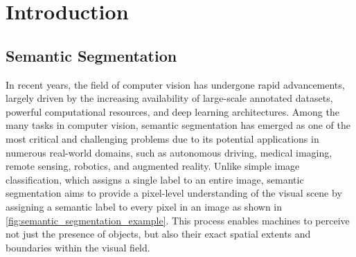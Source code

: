 \chapter{Introduction}
\label{chap:introduction}

\section{Semantic Segmentation}
\label{sec:semantic_segmentation}
In recent years, the field of computer vision has undergone rapid advancements, largely driven by the increasing availability of large-scale annotated datasets, powerful computational resources, and deep learning architectures. Among the many tasks in computer vision, semantic segmentation has emerged as one of the most critical and challenging problems due to its potential applications in numerous real-world domains, such as autonomous driving, medical imaging, remote sensing, robotics, and augmented reality. Unlike simple image classification, which assigns a single label to an entire image, semantic segmentation aims to provide a pixel-level understanding of the visual scene by assigning a semantic label to every pixel in an image as shown in \autoref{fig:semantic_segmentation_example}. This process enables machines to perceive not just the presence of objects, but also their exact spatial extents and boundaries within the visual field.

